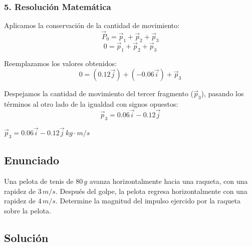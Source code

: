 \documentclass[12pt, a4paper]{article}
\begin{document}
\subsubsection*{5. Resolución Matemática}
Aplicamos la conservación de la cantidad de movimiento:
\[ \vec{P}_0 = \vec{p}_1 + \vec{p}_2 + \vec{p}_3 \]
\[ 0 = \vec{p}_1 + \vec{p}_2 + \vec{p}_3 \]

Reemplazamos los valores obtenidos:
\[ 0 = (0.12 \vec{j}) + (-0.06 \vec{i}) + \vec{p}_3 \]

Despejamos la cantidad de movimiento del tercer fragmento ($\vec{p}_3$), pasando los términos al otro lado de la igualdad con signos opuestos:
\[ \vec{p}_3 = 0.06 \vec{i} - 0.12 \vec{j} \]

\begin{tcolorbox}[colback=green!5!white, colframe=green!50!black, title=Respuesta Final]
\centering \Large $\vec{p}_3 = 0.06 \vec{i} - 0.12 \vec{j} \, \si{kg\cdot m/s}$
\end{tcolorbox}

\newpage

\subsection*{Enunciado}
Una pelota de tenis de $80 \, \si{g}$ avanza horizontalmente hacia una raqueta, con una rapidez de $3 \, \si{m/s}$. Después del golpe, la pelota regresa horizontalmente con una rapidez de $4 \, \si{m/s}$. Determine la magnitud del impulso ejercido por la raqueta sobre la pelota.

\begin{center}
\end{center}

\subsection*{Solución}
\end{document}
